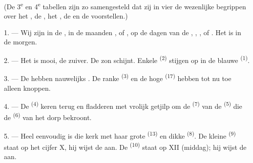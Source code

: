 
\VUsaut{3.0mm}
\VUsaut{1.6mm}
\VUsaut{3.4mm}

(De 3\textsuperscript{e} en 4\textsuperscript{e} tabellen zijn zo samengesteld dat zij in vier
 de wezenlijke begrippen over het
, de , het , de  en
de  voorstellen.)
\VUsaut{4.0mm}

\VUsaut{3.0mm}

\VUsaut{2.4mm}

\VUsaut{3.0mm}

1. --- Wij zijn in de , in de maanden ,
 of , op de dagen van de ,
, , of . Het is  in de morgen.

2. --- Het  is mooi, de  zuiver. De zon schijnt. Enkele
 \textsuperscript{(2)} stijgen op in de blauwe
 \textsuperscript{(1)}.

3. --- De  hebben nauwelijks . De ranke
 \textsuperscript{(3)} en de hoge 
\textsuperscript{(17)} hebben tot nu toe alleen knoppen.

4. --- De  \textsuperscript{(4)} keren terug en fladderen met vrolijk getjilp
om de  \textsuperscript{(7)} van de
 \textsuperscript{(5)} die de 
\textsuperscript{(6)} van het dorp bekroont.

\VUsaut{3.4mm}
\VUsaut{3.0mm}

5. --- Heel eenvoudig is die kerk met haar grote  \textsuperscript{(13)} en
dikke  \textsuperscript{(8)}. De kleine
 \textsuperscript{(9)} staat op het cijfer X, hij wijst de
 aan. De  \textsuperscript{(10)} staat op XII
(middag); hij wijst de  aan.

